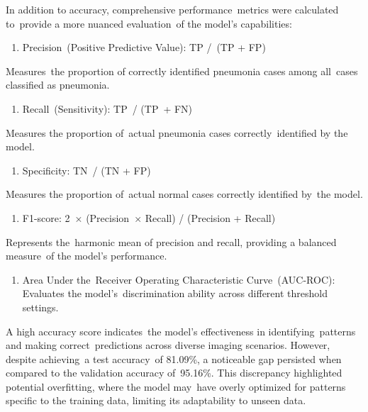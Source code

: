 \documentclass[
  twocolumn,
  10pt,
  a4paper,
  journal
]{IEEEtran}
\begin{document}
In addition to accuracy, comprehensive performance~metrics were
calculated to~provide a more nuanced evaluation~of the
model's capabilities:

\begin{enumerate}
\def\labelenumi{\arabic{enumi}.}
\item
  Precision~(Positive Predictive Value): TP /~(TP + FP)
\end{enumerate}

Measures~the proportion of correctly identified pneumonia cases among
all~cases classified as pneumonia.

\begin{enumerate}
\def\labelenumi{\arabic{enumi}.}
\setcounter{enumi}{1}
\item
  Recall~(Sensitivity): TP~/ (TP~+ FN)
\end{enumerate}

Measures the proportion of~actual pneumonia cases correctly~identified
by the model.

\begin{enumerate}
\def\labelenumi{\arabic{enumi}.}
\setcounter{enumi}{2}
\item
  Specificity: TN~/ (TN + FP)
\end{enumerate}

Measures the proportion of~actual normal cases correctly identified
by~the model.

\begin{enumerate}
\def\labelenumi{\arabic{enumi}.}
\setcounter{enumi}{3}
\item
  F1-score: 2~× (Precision~× Recall) / (Precision + Recall)
\end{enumerate}

Represents the~harmonic mean of precision and recall, providing a
balanced measure~of the model's performance.

\begin{enumerate}
\def\labelenumi{\arabic{enumi}.}
\setcounter{enumi}{4}
\item
  Area Under the~Receiver Operating Characteristic Curve~(AUC-ROC):
  Evaluates the model's~discrimination ability across
  different threshold settings.
\end{enumerate}

A high accuracy score indicates~the model's
effectiveness in identifying~patterns and making correct~predictions
across diverse imaging scenarios. However, despite achieving~a test
accuracy~of 81.09\%, a noticeable gap persisted when compared to the
validation accuracy of~95.16\%. This discrepancy highlighted potential
overfitting, where the model may~have overly optimized for patterns
specific to the training data, limiting its adaptability to unseen data.
\end{document}
